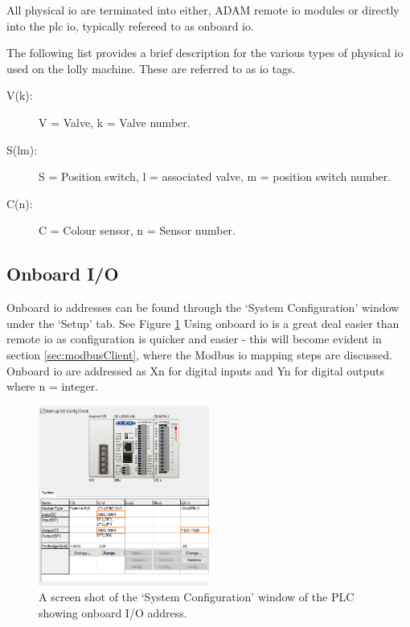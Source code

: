     All physical \acrshort{io} are terminated into either,  ADAM remote \acrshort{io} modules or directly into the \acrshort{plc} \acrshort{io}, typically refereed to as onboard \acrshort{io}.

    The following list provides a brief description for the various types of physical \acrshort{io} used on the lolly machine. These are referred to as \acrshort{io} tags.

    \begin{description}
        \item[V(k):] V = Valve, k = Valve number.
        \item[S(lm):] S = Position switch, l = associated valve, m = position switch number.
        \item[C(n):] C = Colour sensor, n = Sensor number.
    \end{description}



    \subsection{Onboard I/O}
        Onboard \acrshort{io} addresses can be found through the `System Configuration' window under the `Setup' tab. See Figure \ref{fig:plcConfig}
        Using onboard \acrshort{io} is a great deal easier than remote \acrshort{io} as configuration is quicker and easier - this will become evident in section \ref{sec:modbusClient}, where the Modbus \acrshort{io} mapping steps are discussed. Onboard \acrshort{io} are addressed as Xn for digital inputs and Yn for digital outputs where n = integer.
        
        \begin{figure}[H]
            \centering
            \includegraphics[width = 0.5\textwidth]{2_images/plcConfig.png}
            \caption{A screen shot of the `System Configuration' window of the PLC showing onboard I/O address.}
            \label{fig:plcConfig}
        \end{figure}
        

